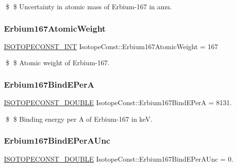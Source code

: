 \$ \$ Uncertainty in atomic mass of Erbium-\/167 in amu. \mbox{\label{group___isotope_const-_erbium-_er167_gaa03379f8e7961b13b7392faf9c8b17b3}} 
\subsubsection{\texorpdfstring{Erbium167\+Atomic\+Weight}{Erbium167AtomicWeight}}
{\footnotesize\ttfamily \mbox{\hyperlink{group___isotope_const-_macros_ga5f18360b3e99483a35c32d789e62621c}{I\+S\+O\+T\+O\+P\+E\+C\+O\+N\+S\+T\+\_\+\+I\+NT}} Isotope\+Const\+::\+Erbium167\+Atomic\+Weight = 167}

\$ \$ Atomic weight of Erbium-\/167. \mbox{\label{group___isotope_const-_erbium-_er167_gafa31f763a2f0e800610a19330ad9ffd0}} 
\subsubsection{\texorpdfstring{Erbium167\+Bind\+E\+PerA}{Erbium167BindEPerA}}
{\footnotesize\ttfamily \mbox{\hyperlink{group___isotope_const-_macros_ga8f45a7272ce02c0b4c65c44636ed719a}{I\+S\+O\+T\+O\+P\+E\+C\+O\+N\+S\+T\+\_\+\+D\+O\+U\+B\+LE}} Isotope\+Const\+::\+Erbium167\+Bind\+E\+PerA = 8131.}

\$ \$ Binding energy per A of Erbium-\/167 in keV. \mbox{\label{group___isotope_const-_erbium-_er167_ga1f2d9c171815b49b4cf767d94a1a5c2b}} 
\subsubsection{\texorpdfstring{Erbium167\+Bind\+E\+Per\+A\+Unc}{Erbium167BindEPerAUnc}}
{\footnotesize\ttfamily \mbox{\hyperlink{group___isotope_const-_macros_ga8f45a7272ce02c0b4c65c44636ed719a}{I\+S\+O\+T\+O\+P\+E\+C\+O\+N\+S\+T\+\_\+\+D\+O\+U\+B\+LE}} Isotope\+Const\+::\+Erbium167\+Bind\+E\+Per\+A\+Unc = 0.}


